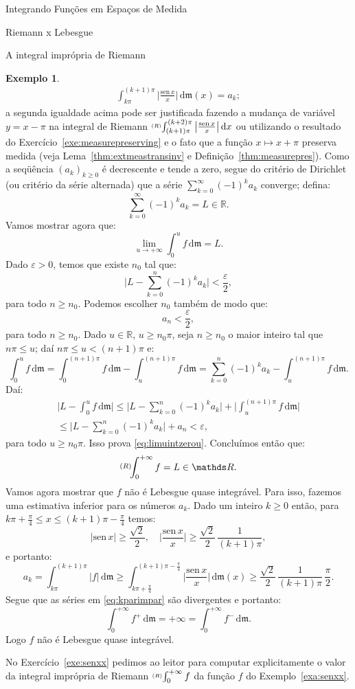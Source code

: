 \documentclass[oneside,final,11pt]{amsbook}
\newcommand{\R}{\mathds R}
\newcommand{\leb}{\mathfrak m}
\newcommand{\dd}{\mathrm d}
\newcommand{\sen}{\mathrm{sen}}
\newcommand{\intRd}{\raise2pt\hbox{$\scriptstyle(R)$}\!\!\int}
\newcommand{\intR}{\raise2pt\hbox{$\scriptscriptstyle(R)$}\!\int}
\theoremstyle{remark}\newtheorem{exercise}{Exercício}[chapter]
\theoremstyle{remark}\newtheorem{*exercise}[exercise]{\hbox to 0pt{\hskip 0pt minus 1fil*}Exercício}
\theoremstyle{definition}\newtheorem{exdefin}{Definição}[chapter]
\theoremstyle{plain}\newtheorem{teo}{Teorema}[section]
\theoremstyle{plain}\newtheorem{lem}[teo]{Lema}
\theoremstyle{plain}\newtheorem{prop}[teo]{Proposição}
\theoremstyle{plain}\newtheorem{cor}[teo]{Corolário}
\theoremstyle{definition}\newtheorem{defin}[teo]{Definição}
\theoremstyle{remark}\newtheorem{rem}[teo]{Observação}
\theoremstyle{definition}\newtheorem{notation}[teo]{Notação}
\theoremstyle{definition}\newtheorem{convention}[teo]{Convenção}
\theoremstyle{definition}\newtheorem{example}[teo]{Exemplo}
\numberwithin{section}{chapter}
\numberwithin{equation}{section}
\begin{document}
\begin{chapter}{Integrando Funções em Espaços de Medida}
\begin{section}{Riemann x Lebesgue}
\begin{subsection}{A integral imprópria de Riemann}
\begin{example}
\begin{multline*}
\int_{k\pi}^{(k+1)\pi}\Big\vert\frac{\sen\,x}x\Big\vert\,\dd\leb(x)=a_k;
\end{multline*}
a segunda igualdade acima pode ser justificada fazendo a mudança de variável
$y=x-\pi$ na integral de Riemann $\intR_{(k+1)\pi}^{(k+2)\pi}\big\vert\frac{\sen\,x}x\big\vert\,\dd x$
ou utilizando o resultado do Exercício~\ref{exe:measurepreserving} e o fato que a função
$x\mapsto x+\pi$ preserva medida (veja Lema~\ref{thm:extmeastransinv} e Definição~\ref{thm:measurepres}).
Como a seqüência $(a_k)_{k\ge0}$ é decrescente e tende a zero, segue do critério de Dirichlet
(ou critério da série alternada) que a série $\sum_{k=0}^\infty(-1)^ka_k$ converge; defina:
\[\sum_{k=0}^\infty(-1)^ka_k=L\in\R.\]
Vamos mostrar agora que:
\begin{equation}\label{eq:limuintzerou}
\lim_{u\to+\infty}\int_0^uf\,\dd\leb=L.
\end{equation}
Dado $\varepsilon>0$, temos que existe $n_0$ tal que:
\[\Big\vert L-\sum_{k=0}^n(-1)^ka_k\Big\vert<\frac\varepsilon2,\]
para todo $n\ge n_0$. Podemos escolher $n_0$ também de modo que:
\[a_n<\frac\varepsilon2,\]
para todo $n\ge n_0$.
Dado $u\in\R$, $u\ge n_0\pi$, seja $n\ge n_0$ o maior inteiro
tal que $n\pi\le u$; daí $n\pi\le u<(n+1)\pi$ e:
\[\int_0^uf\,\dd\leb=\int_0^{(n+1)\pi}f\,\dd\leb-\int_u^{(n+1)\pi}f\,\dd\leb=
\sum_{k=0}^n(-1)^ka_k-\int_u^{(n+1)\pi}f\,\dd\leb.\]
Daí:
\begin{multline*}
\Big\vert L-\int_0^uf\,\dd\leb\Big\vert\le\Big\vert L-\sum_{k=0}^n(-1)^ka_k\Big\vert
+\Big\vert\int_u^{(n+1)\pi}f\,\dd\leb\Big\vert\\
\le\Big\vert L-\sum_{k=0}^n(-1)^ka_k\Big\vert+a_n<\varepsilon,
\end{multline*}
para todo $u\ge n_0\pi$. Isso prova \eqref{eq:limuintzerou}. Concluímos então que:
\[\intRd_0^{+\infty}f=L\in\R.\]
Vamos agora mostrar que $f$ não é Lebesgue quase integrável.
Para isso, fazemos uma estimativa inferior para os números $a_k$. Dado um inteiro
$k\ge0$ então, para $k\pi+\frac\pi4\le x\le(k+1)\pi-\frac\pi4$ temos:
\[\vert\sen\,x\vert\ge\frac{\sqrt2}2,\quad
\Big\vert\frac{\sen\,x}x\Big\vert\ge\frac{\sqrt2}2\,\frac1{(k+1)\pi},\]
e portanto:
\[a_k=\int_{k\pi}^{(k+1)\pi}\vert f\vert\,\dd\leb
\ge\int_{k\pi+\frac\pi4}^{(k+1)\pi-\frac\pi4}\Big\vert\frac{\sen\,x}x\Big\vert\,\dd\leb(x)
\ge\frac{\sqrt2}2\,\frac1{(k+1)\pi}\,\frac\pi2.\]
Segue que as séries em \eqref{eq:kparimpar} são divergentes e portanto:
\[\int_0^{+\infty}f^+\,\dd\leb=+\infty=\int_0^{+\infty}f^-\,\dd\leb.\]
Logo $f$ não é Lebesgue quase integrável.
\end{example}
No Exercício~\ref{exe:senxx} pedimos ao leitor para computar explicitamente
o valor da integral imprópria de Riemann $\intR_0^{+\infty}f$ da função
$f$ do Exemplo~\ref{exa:senxx}.


\end{subsection}
\end{section}
\end{chapter}
\end{document}
